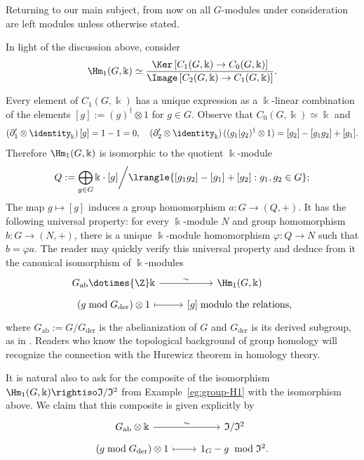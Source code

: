 Returning to our main subject, from now on all $G$-modules under consideration
are left modules unless otherwise stated.

\begin{example}\label{eg:group-H1-further}
	In light of the discussion above, consider
	\[ \Hm_1(G, \Bbbk) \simeq \frac{\Ker\left[ C_1(G, \Bbbk) \to C_0(G, \Bbbk) \right]}{\Image\left[ C_2(G, \Bbbk) \to C_1(G, \Bbbk) \right]}. \]

	Every element of $C_1(G,\Bbbk)$ has a unique expression as a
	$\Bbbk$-linear combination of the elements
	$[g]:=(g)^\dagger\otimes1$ for $g\in G$. Observe that
	$C_0(G,\Bbbk)\simeq\Bbbk$ and
	\[ \left( \partial'_1 \otimes \identity_{\Bbbk}\right)[g] = 1 - 1 = 0, \quad \left( \partial'_2 \otimes \identity_{\Bbbk}\right)((g_1 | g_2)^\dagger \otimes 1) = [g_2] - [g_1 g_2] + [g_1]. \]
	Therefore $\Hm_1(G,\Bbbk)$ is isomorphic to the quotient $\Bbbk$-module
	\[ Q := \bigoplus_{g \in G} \Bbbk \cdot [g] \bigg/ \lrangle{ [g_1 g_2] - [g_1] + [g_2] : g_1, g_2 \in G }; \]
	The map $g\mapsto[g]$ induces a group homomorphism $a:G\to(Q,+)$. It has
	the following universal property: for every $\Bbbk$-module $N$ and group
	homomorphism $b:G\to(N,+)$, there is a unique $\Bbbk$-module homomorphism
	$\varphi:Q\to N$ such that $b=\varphi a$. The reader may quickly verify
	this universal property and deduce from it the canonical isomorphism of
	$\Bbbk$-modules
	\[\begin{tikzcd}[row sep=tiny]
		G_{\mathrm{ab}} \dotimes{\Z} \Bbbk \arrow[r, "\sim"] & \Hm_1(G, \Bbbk) \\
		(g \bmod G_{\mathrm{der}}) \otimes 1 \arrow[mapsto, r] & {[g] \;\text{modulo the relations}},
	\end{tikzcd}\]
	where $G_{\mathrm{ab}}:=G/G_{\mathrm{der}}$ is the abelianization of $G$
	and $G_{\mathrm{der}}$ is its derived subgroup, as in
	\cite[Definition 4.7.2]{Li1}. Readers who know the topological background
	of group homology will recognize the connection with the Hurewicz theorem
	in homology theory.

	It is natural also to ask for the composite of the isomorphism
	$\Hm_1(G,\Bbbk)\rightiso\mathfrak{I}/\mathfrak{I}^2$ from
	Example~\ref{eg:group-H1} with the isomorphism above. We claim that this
	composite is given explicitly by
	\[\begin{tikzcd}[row sep=tiny]
		G_{\mathrm{ab}} \otimes \Bbbk \arrow[r, "\sim"] & \mathfrak{I}/\mathfrak{I}^2 \\
		(g \bmod G_{\mathrm{der}}) \otimes 1 \arrow[mapsto, r] & 1_G - g \;\bmod \mathfrak{I}^2.
	\end{tikzcd}\]


\end{example}
